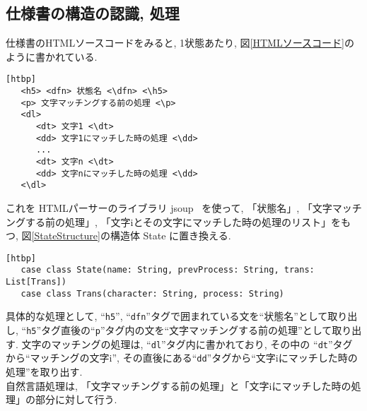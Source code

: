 \documentclass[uplatex,a4j]{jsreport}
\begin{document}
\subsection{仕様書の構造の認識, 処理}
仕様書のHTMLソースコードをみると, 1状態あたり, 図\ref{HTMLソースコード}のように書かれている. 
\begin{lstlisting}[basicstyle=\ttfamily\footnotesize, frame=single, caption=HTMLソースコード,label=HTMLソースコード][htbp]
   <h5> <dfn> 状態名 <\dfn> <\h5>
   <p> 文字マッチングする前の処理 <\p>
   <dl>
      <dt> 文字1 <\dt>
      <dd> 文字1にマッチした時の処理 <\dd>
      ...
      <dt> 文字n <\dt>
      <dd> 文字nにマッチした時の処理 <\dd>
   <\dl>
\end{lstlisting}
これを HTMLパーサーのライブラリ jsoup ~\cite{jsoup}を使って, 
「状態名」, 「文字マッチングする前の処理」, 「文字iとその文字にマッチした時の処理のリスト」をもつ, 図\ref{StateStructure}の構造体 State に置き換える. \\
\begin{lstlisting}[basicstyle=\ttfamily\footnotesize, frame=single, caption=Stateの構造体,label=StateStructure][htbp]
   case class State(name: String, prevProcess: String, trans: List[Trans])
   case class Trans(character: String, process: String)
\end{lstlisting}
具体的な処理として, 
``\texttt{h5}'', ``\texttt{dfn}''タグで囲まれている文を``状態名''として取り出し, 
``\texttt{h5}''タグ直後の``\texttt{p}''タグ内の文を``文字マッチングする前の処理''として取り出す.
文字のマッチングの処理は, ``\texttt{dl}''タグ内に書かれており, 
その中の ``\texttt{dt}''タグから``マッチングの文字i'', その直後にある``\texttt{dd}''タグから``文字iにマッチした時の処理''を取り出す.\\

自然言語処理は, 「文字マッチングする前の処理」と「文字iにマッチした時の処理」の部分に対して行う. 


\end{document}
